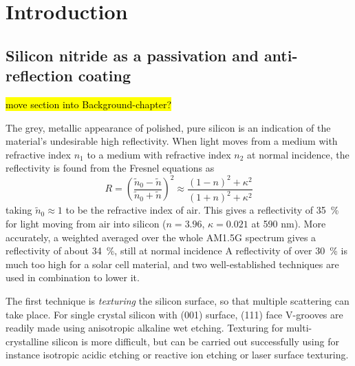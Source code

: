 \documentclass[11pt,bibliography=totoc,index=totoc]{scrbook}   %
\newcommand{\comment}[1]{\hl{#1}}
\begin{document}
\section{Introduction}

\subsection{Silicon nitride as a passivation and anti-reflection coating}
\comment{move section into  Background-chapter?}

The grey, metallic appearance of polished, pure silicon is an indication of the material's undesirable high reflectivity.
When light moves from a medium with refractive index $n_1$ to a medium with refractive index $n_2$ at normal incidence, 
the reflectivity is found from the Fresnel equations as
\begin{equation}
    R = \left(\frac{\tilde{n}_0-\tilde{n}}{\tilde{n}_0+\tilde{n}}\right)^2 \approx
    \frac{(1 - n)^2 + \kappa^2}{(1 + n)^2 + \kappa^2}
  \label{eq:reflectivity}
\end{equation}
taking $\tilde{n}_0\approx 1$ to be the refractive index of air.
This gives a reflectivity of 35~\% for light moving from air into silicon ($n=3.96$, $\kappa=0.021$ at 590 nm\cite{www:refractiveindex-Si}).
More accurately, a weighted averaged over the whole AM1.5G spectrum gives a reflectivity of about 34~\%, still at normal incidence\cite{Macdonald:2004}
A reflectivity of over 30~\% is much too high for a solar cell material, and
two well-established techniques are used in combination to lower it.

The first technique is \emph{texturing} the silicon surface, so that multiple scattering can take place.
For single crystal silicon with (001) surface, (111) face V-grooves are readily made using anisotropic alkaline wet etching.
Texturing for multi-crystalline silicon is more difficult, but can be carried out successfully using for instance
isotropic acidic etching or reactive ion etching\cite{Macdonald:2004,Panek:2005,Koynov:2006} or laser surface texturing\cite{Iyengar:2010}.
\end{document}

